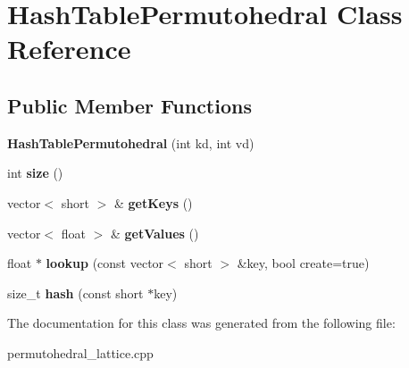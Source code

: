 \hypertarget{classHashTablePermutohedral}{}\section{Hash\+Table\+Permutohedral Class Reference}
\label{classHashTablePermutohedral}
\subsection*{Public Member Functions}
\begin{DoxyCompactItemize}
\item 
{\bfseries Hash\+Table\+Permutohedral} (int kd, int vd)\hypertarget{classHashTablePermutohedral_aacba6988ff20b3238661b551c4e2f0db}{}\label{classHashTablePermutohedral_aacba6988ff20b3238661b551c4e2f0db}

\item 
int {\bfseries size} ()\hypertarget{classHashTablePermutohedral_a9e0fe5faead11889fde71fe9d4f31ef3}{}\label{classHashTablePermutohedral_a9e0fe5faead11889fde71fe9d4f31ef3}

\item 
vector$<$ short $>$ \& {\bfseries get\+Keys} ()\hypertarget{classHashTablePermutohedral_ab2c34c1a7ee93f7f90f7990947de19b2}{}\label{classHashTablePermutohedral_ab2c34c1a7ee93f7f90f7990947de19b2}

\item 
vector$<$ float $>$ \& {\bfseries get\+Values} ()\hypertarget{classHashTablePermutohedral_a0ae627d11ee3f81de2a9ec5c6a08bf57}{}\label{classHashTablePermutohedral_a0ae627d11ee3f81de2a9ec5c6a08bf57}

\item 
float $\ast$ {\bfseries lookup} (const vector$<$ short $>$ \&key, bool create=true)\hypertarget{classHashTablePermutohedral_a48b76ae6d8f0d5140731d3ba1ccee2c4}{}\label{classHashTablePermutohedral_a48b76ae6d8f0d5140731d3ba1ccee2c4}

\item 
size\+\_\+t {\bfseries hash} (const short $\ast$key)\hypertarget{classHashTablePermutohedral_a009a7e5293898ee2f2d823f1d0509dbf}{}\label{classHashTablePermutohedral_a009a7e5293898ee2f2d823f1d0509dbf}

\end{DoxyCompactItemize}


The documentation for this class was generated from the following file\+:\begin{DoxyCompactItemize}
\item 
permutohedral\+\_\+lattice.\+cpp\end{DoxyCompactItemize}
